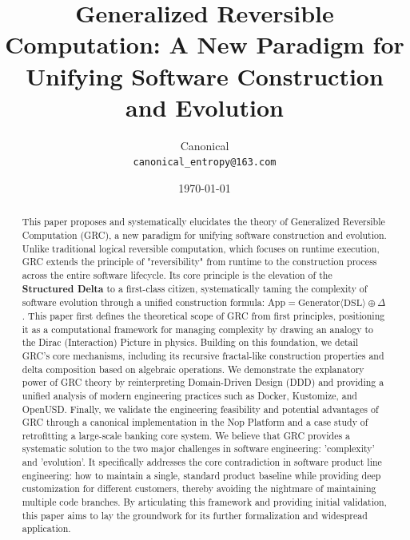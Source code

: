 \documentclass[11pt]{article}
\begin{document}
\title{\textbf{Generalized Reversible Computation: A New Paradigm for Unifying Software Construction and Evolution}}
\author{Canonical \\ \texttt{canonical\_entropy@163.com}}
\date{\today}

\maketitle

\begin{abstract}
This paper proposes and systematically elucidates the theory of Generalized Reversible Computation (GRC), a new paradigm for unifying software construction and evolution. Unlike traditional logical reversible computation, which focuses on runtime execution, GRC extends the principle of "reversibility" from runtime to the construction process across the entire software lifecycle. Its core principle is the elevation of the \textbf{Structured Delta} to a first-class citizen, systematically taming the complexity of software evolution through a unified construction formula: $\text{App} = \text{Generator}\langle\text{DSL}\rangle \oplus \Delta$. This paper first defines the theoretical scope of GRC from first principles, positioning it as a computational framework for managing complexity by drawing an analogy to the Dirac (Interaction) Picture in physics. Building on this foundation, we detail GRC's core mechanisms, including its recursive fractal-like construction properties and delta composition based on algebraic operations. We demonstrate the explanatory power of GRC theory by reinterpreting Domain-Driven Design (DDD) and providing a unified analysis of modern engineering practices such as Docker, Kustomize, and OpenUSD. Finally, we validate the engineering feasibility and potential advantages of GRC through a canonical implementation in the Nop Platform and a case study of retrofitting a large-scale banking core system. We believe that GRC provides a systematic solution to the two major challenges in software engineering: 'complexity' and 'evolution'. It specifically addresses the core contradiction in software product line engineering: how to maintain a single, standard product baseline while providing deep customization for different customers, thereby avoiding the nightmare of maintaining multiple code branches. By articulating this framework and providing initial validation, this paper aims to lay the groundwork for its further formalization and widespread application. 
\end{abstract}
\end{document}
